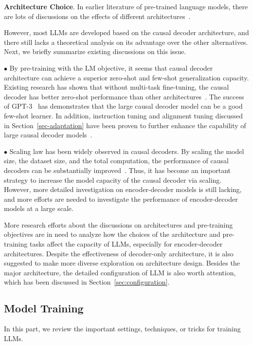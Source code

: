 \textbf{Architecture Choice}.  {In earlier literature of pre-trained language models, there are lots of discussions on the effects of different architectures~\cite{Wang-ICML-2022-What,Tay-arxiv-2022-UL2}}.

However, most LLMs are developed based on the causal decoder architecture, and there  still lacks a theoretical analysis on its advantage over the other alternatives.  Next, we briefly summarize existing  discussions on this issue. 

$\bullet$ By pre-training with the LM objective, it seems that causal decoder architecture can achieve a superior zero-shot and few-shot generalization capacity. Existing research has shown that without multi-task fine-tuning, the causal decoder has better zero-shot performance than other architectures~\cite{Wang-ICML-2022-What}. The success of GPT-3~\cite{Brown-NeurIPS-2020-Language} has demonstrates that the large causal decoder model can be a good few-shot learner. In addition, instruction tuning and alignment tuning discussed in Section~\ref{sec-adaptation} have been proven to further enhance the capability of large causal decoder models~\cite{Wei-ICLR-2022-Finetuned,Ouyang-arxiv-2022-Training,Chung-arxiv-2022-Scaling}. 

$\bullet$  Scaling law has been widely observed in causal decoders. By scaling the model size, the dataset size, and the total computation, the performance of causal decoders can be substantially   improved~\cite{Kaplan-arxiv-2020-Scaling,Brown-NeurIPS-2020-Language}. Thus, it has become an important strategy to increase the model capacity of the causal decoder via  scaling. However, more detailed investigation on encoder-decoder models is still lacking, and more efforts are needed to investigate the performance of  encoder-decoder models at a large scale.

More research efforts about the discussions on architectures and pre-training objectives are in need to analyze how the choices of the architecture and pre-training tasks affect the capacity of LLMs, especially for encoder-decoder architectures. Despite the effectiveness of decoder-only architecture, it is also suggested to make more diverse exploration on architecture design. Besides the major architecture, the detailed configuration of LLM is also worth attention, which has been discussed in Section~\ref{sec:configuration}. 

\subsection{Model Training}
\label{sec:training_settings}
In this part, we review the important settings, techniques, or tricks for training LLMs. 

